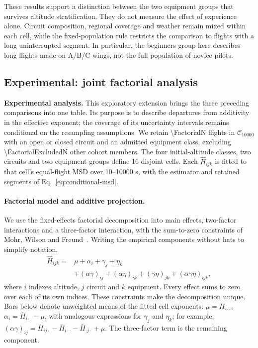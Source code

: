 These results support a distinction between the two equipment groups that survives
altitude stratification. They do not measure the effect of experience alone.
Circuit composition, regional coverage and weather remain mixed within each cell,
while the fixed-population rule restricts the comparison to flights with a long
uninterrupted segment. In particular, the beginners group here describes long
flights made on A/B/C wings, not the full population of novice pilots.
\FloatBarrier

\subsection{Experimental: joint factorial analysis}
\label{sec:conditional-factorial}

\noindent\textbf{Experimental analysis.}
This exploratory extension brings the three preceding comparisons into one
table. Its purpose is to describe departures from additivity in the effective
exponent; the coverage of its uncertainty intervals remains conditional on the
resampling assumptions. We retain \num{\FactorialN} flights in
$\mathcal C_{10000}$ with an open or closed circuit and an admitted equipment
class, excluding \num{\FactorialExcludedN} other cohort members. The four
initial-altitude classes, two circuits and two equipment groups define 16
disjoint cells. Each $\widehat H_{ijk}$ is fitted to that cell's equal-flight MSD
over 10--10000 s, with the estimator and retained segments of
Eq.~\eqref{eq:conditional-msd}.

\paragraph{Factorial model and additive projection.}
We use the fixed-effects factorial decomposition into main effects, two-factor
interactions and a three-factor interaction, with the sum-to-zero constraints
of Mohr, Wilson and Freund~\cite[Sections~9.3.1 and~9.7]{mohr2022statistical}.
Writing the empirical components without hats to simplify notation,
\begin{equation}
 \begin{aligned}
 \widehat H_{ijk}={}&\mu+\alpha_i+\gamma_j+\eta_k\\
 &+(\alpha\gamma)_{ij}+(\alpha\eta)_{ik}
   +(\gamma\eta)_{jk}+(\alpha\gamma\eta)_{ijk},
 \end{aligned}
 \label{eq:factorial-decomposition}
\end{equation}
where $i$ indexes altitude, $j$ circuit and $k$ equipment. Every effect sums to
zero over each of its own indices. These constraints make the decomposition
unique. Bars below denote unweighted means of the fitted cell exponents:
$\mu=\overline H_{\cdot\cdot\cdot}$,
$\alpha_i=\overline H_{i\cdot\cdot}-\mu$, with analogous expressions for
$\gamma_j$ and $\eta_k$; for example,
$(\alpha\gamma)_{ij}=\overline H_{ij\cdot}
-\overline H_{i\cdot\cdot}-\overline H_{\cdot j\cdot}+\mu$.
The three-factor term is the remaining component.

